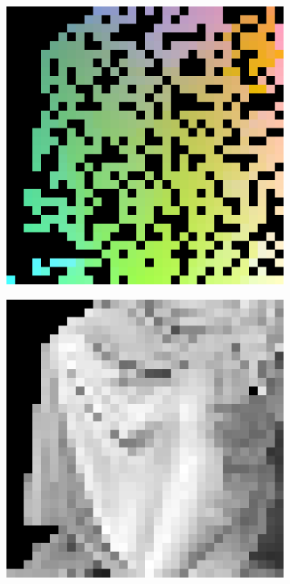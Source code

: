 \begin{figure}
	\begin{subfigure}[b]{0.19\linewidth}
		\includegraphics[width=\linewidth]{./Figures/gcnn_synthetic/eval_3_input.png}
	\end{subfigure}
	\begin{subfigure}[b]{0.19\linewidth}
	\includegraphics[width=\linewidth]{./Figures/gcnn_synthetic/eval_3_img.png}

\end{subfigure}
\end{figure}
